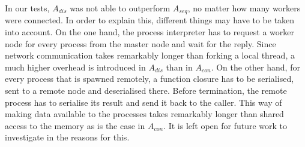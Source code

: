 In our tests, $A_{dis}$ was not able to outperform $A_{seq}$, no matter how many workers were connected. In order to explain this, different things may have to be taken into account. On the one hand, the process interpreter has to request a worker node for every process from the master node and wait for the reply. Since network communication takes remarkably longer than forking a local thread, a much higher overhead is introduced in $A_{dis}$ than in $A_{con}$. On the other hand, for every process that is spawned remotely, a function closure has to be serialised, sent to a remote node and deserialised there. Before termination, the remote process has to serialise its result and send it back to the caller. This way of making data available to the processes takes remarkably longer than shared access to the memory as is the case in $A_{con}$. It is left open for future work to investigate in the reasons for this.